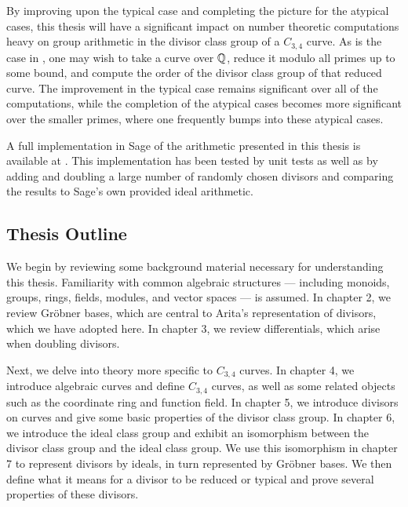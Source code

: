 \begin{table}
  \label{tab_op_count_intro}
\end{table}

By improving upon the typical case and completing the picture for the atypical cases,
this thesis will have a significant impact on number theoretic computations
heavy on group arithmetic in the divisor class group of a $C_{3,4}$ curve.
As is the case in \cite{sutherland16}, 
one may wish to take a curve over $\mathbb{Q}$, reduce it modulo all primes up to some bound,
and compute the order of the divisor class group of that reduced curve.
The improvement in the typical case remains significant over all of the computations,
while the completion of the atypical cases becomes more significant over the smaller primes,
where one frequently bumps into these atypical cases.

A full implementation in Sage of the arithmetic presented in this thesis is available at \cite{github}.
This implementation has been tested by unit tests as well as by adding and doubling a large number of randomly chosen divisors
and comparing the results to Sage's own provided ideal arithmetic.




\subsection{Thesis Outline}


We begin by reviewing some background material necessary for understanding this thesis.
Familiarity with common algebraic structures ---
including monoids, groups, rings, fields, modules, and vector spaces --- is assumed.
In chapter 2, we review Gr\"obner bases,
which are central to Arita's representation of divisors,
which we have adopted here.
In chapter 3, we review differentials, which arise when doubling divisors.

Next, we delve into theory more specific to $C_{3,4}$ curves.
In chapter 4, we introduce algebraic curves and define $C_{3,4}$ curves,
as well as some related objects such as the coordinate ring and function field.
In chapter 5, we introduce divisors on curves and give some basic properties of the divisor class group.
In chapter 6, we introduce the ideal class group and exhibit an isomorphism between the divisor class group and the ideal class group.
We use this isomorphism in chapter 7 to represent divisors by ideals, in turn represented by Gr\"obner bases.
We then define what it means for a divisor to be reduced or typical
and prove several properties of these divisors.

